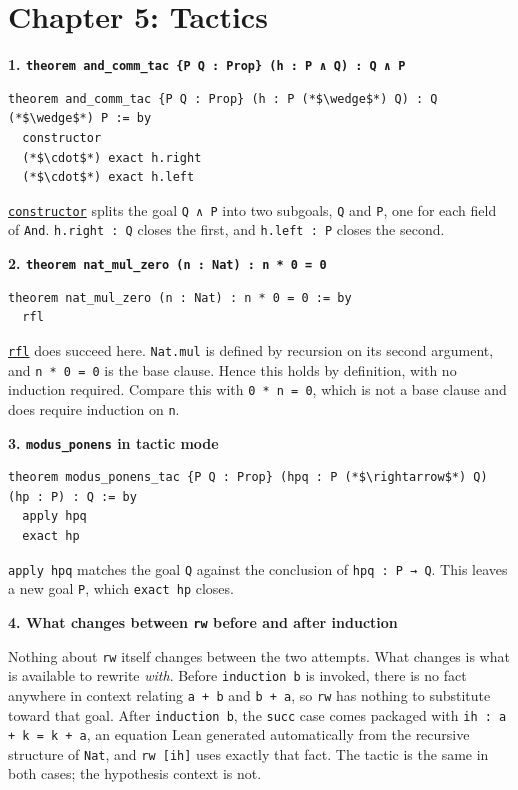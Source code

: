 \section{Chapter 5: Tactics}\label{sec:15-appendix-solutions:05-chapter-5:1}

\textbf{1. \texttt{theorem and\_\allowbreak{}comm\_\allowbreak{}tac \{P Q : Prop\} (h : P ∧ Q) : Q ∧ P}}

\begin{lstlisting}
theorem and_comm_tac {P Q : Prop} (h : P (*$\wedge$*) Q) : Q (*$\wedge$*) P := by
  constructor
  (*$\cdot$*) exact h.right
  (*$\cdot$*) exact h.left
\end{lstlisting}

\href{https://lean-lang.org/doc/reference/latest/Tactic-Proofs/Tactic-Reference/}{\texttt{constructor}} splits the goal \texttt{Q ∧ P} into two subgoals, \texttt{Q} and \texttt{P}, one for each field of \texttt{And}. \texttt{h.right : Q} closes the first, and \texttt{h.left : P} closes the second.

\textbf{2. \texttt{theorem nat\_\allowbreak{}mul\_\allowbreak{}zero (n : Nat) : n * 0 = 0}}

\begin{lstlisting}
theorem nat_mul_zero (n : Nat) : n * 0 = 0 := by
  rfl
\end{lstlisting}

\href{https://lean-lang.org/doc/reference/latest/Tactic-Proofs/Tactic-Reference/}{\texttt{rfl}} does succeed here. \texttt{Nat.mul} is defined by recursion on its second argument, and \texttt{n * 0 = 0} is the base clause. Hence this holds by definition, with no induction required. Compare this with \texttt{0 * n = 0}, which is not a base clause and does require induction on \texttt{n}.

\textbf{3. \texttt{modus\_\allowbreak{}ponens} in tactic mode}

\begin{lstlisting}
theorem modus_ponens_tac {P Q : Prop} (hpq : P (*$\rightarrow$*) Q) (hp : P) : Q := by
  apply hpq
  exact hp
\end{lstlisting}

\texttt{apply hpq} matches the goal \texttt{Q} against the conclusion of \texttt{hpq : P → Q}. This leaves a new goal \texttt{P}, which \texttt{exact hp} closes.

\textbf{4. What changes between \texttt{rw} before and after induction}

Nothing about \texttt{rw} itself changes between the two attempts. What changes is what is available to rewrite \emph{with}. Before \texttt{induction b} is invoked, there is no fact anywhere in context relating \texttt{a + b} and \texttt{b + a}, so \texttt{rw} has nothing to substitute toward that goal. After \texttt{induction b}, the \texttt{succ} case comes packaged with \texttt{ih : a + k = k + a}, an equation Lean generated automatically from the recursive structure of \texttt{Nat}, and \texttt{rw [ih]} uses exactly that fact. The tactic is the same in both cases; the hypothesis context is not.

